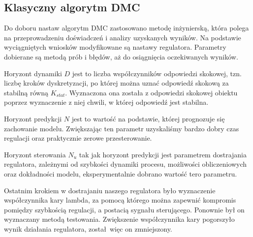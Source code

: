 %     

%     

%     


\subsection{Klasyczny algorytm DMC}
\label{projekt:zad4:DMC}

Do doboru nastaw algorytm DMC zastosowano metodę inżynierską, 
która polega na przeprowadzeniu doświadczeń i analizy uzyskanych wyników. 
Na podstawie wyciągniętych wniosków modyfikowane są nastawy regulatora. 
Parametry  dobierane są metodą prób i błędów, aż do osiągnięcia oczekiwanych wyników.

\indent Horyzont dynamiki $D$ jest to liczba współczynników odpowiedzi skokowej, 
tzn. liczbę kroków dyskretyzacji, po której można uznać odpowiedź skokową za stabilną równą $K_{stat}$. 
Wyznaczona ona została z odpowiedzi skokowej obiektu poprzez wyznaczenie z niej chwili, 
w której odpowiedź jest stabilna.

\indent Horyzont predykcji $N$ jest to wartość na podstawie, 
której prognozuje się zachowanie modelu. 
Zwiększając ten parametr uzyskaliśmy bardzo dobry czas regulacji oraz praktycznie zerowe przesterowanie.

\indent Horyzont sterowania $N_{u}$ tak jak horyzont predykcji jest parametrem dostrajania regulatora, 
zależnymi od szybkości dynamiki procesu, możliwości obliczeniowych oraz dokładności modelu, 
eksperymentalnie dobrano wartość tero parametru.

Ostatnim krokiem w dostrajaniu naszego regulatora było wyznaczenie współczynnika kary lambda, 
za pomocą którego można zapewnić kompromis pomiędzy szybkością regulacji, a postacią sygnału sterującego. 
Ponownie był on wyznaczany metodą testowania. 
Zwiększenie współczynnika kary pogorszyło wynik działania regulatora, został więc on zmniejszony.

